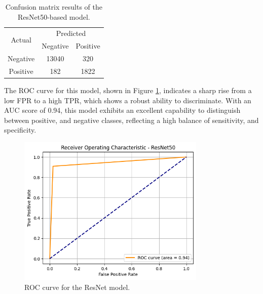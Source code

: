 \documentclass[../main]{subfiles}
\begin{document}
\begin{table}[h!]
    \centering
    \begin{tabular}{|c|c|c|}
        \hline
        \multirow{2}{*}{Actual} & \multicolumn{2}{c|}{Predicted} \\ \cline{2-3}
                                & Negative         & Positive         \\ \hline
        Negative                & 13040            & 320              \\ \hline
        Positive                & 182              & 1822              \\ \hline
    \end{tabular}
    \caption{Confusion matrix results of the ResNet50-based model.}
    \label{tab:confusion-matrix-resnet}
\end{table}

\noindent The ROC curve for this model, shown in Figure \ref{fig:roc-resnet}, indicates a sharp rise from a low FPR to a high TPR, which shows a robust ability to discriminate. With an AUC score of 0.94, this model exhibits an excellent capability to distinguish between positive, and negative classes, reflecting a high balance of sensitivity, and specificity.

\begin{figure}[h!]
	\centering
	\includegraphics[width=0.8\textwidth]{assets/roc_resnet.png}
	\caption{ROC curve for the ResNet model.}
    \label{fig:roc-resnet}
\end{figure}

\clearpage
\end{document}

